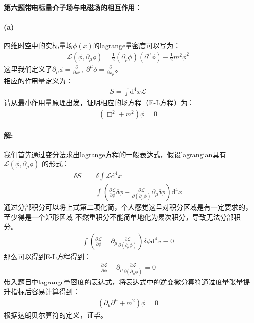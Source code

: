 \documentclass[a4paper]{ctexart}
\def\d{\mathrm{d}}
\begin{document}
    \paragraph{第六题\;带电标量介子场与电磁场的相互作用：}
    \paragraph{(a)}
     四维时空中的实标量场$\phi(x)$的lagrange量密度可以写为：
    \begin{align}
        \mathcal{L}(\phi, \partial_{\mu}\phi) = \frac{1}{2}(\partial_{\mu}\phi)(\partial^{\mu}\phi) - \frac{1}{2}m^{2}\phi^{2}
    \end{align}
    这里我们定义了$\partial_{\mu}\phi = \frac{\partial}{\partial x^{\mu}},\;\partial^{\mu}\phi = \frac{\partial}{\partial x_{\mu}}$。\\
    相应的作用量定义为：
    \begin{align}
        S = \int\d ^{4}x\mathcal{L}
    \end{align}
    请从最小作用量原理出发，证明相应的场方程（E-L方程）为：
    \begin{align}
        (\Box^{2} + m^{2})\phi = 0
    \end{align}
    \paragraph{解:}
    我们首先通过变分法求出lagrange方程的一般表达式，假设lagrangian具有$\mathcal{L}(\phi, \partial_{\mu}\phi)$
    的形式：
    \begin{align}
        \delta S &= \delta\int\mathcal{L}\d^{4} x\\
        & = \int\left(\frac{\partial \mathcal{L}}{\partial \phi}\delta \phi + \frac{\partial\mathcal{L}}{\partial(\partial_{\mu}\phi)}\partial_{\mu}\delta\phi\right)\d^{4}x
    \end{align}
    通过分部积分可以将上式第二项化简，个人感觉这里对积分区域是有一定要求的，至少得是一个矩形区域
    不然重积分不能简单地化为累次积分，导致无法分部积分。
    \begin{align}
        \int\left(\frac{\partial \mathcal{L}}{\partial \phi} - \partial_{\mu}\frac{\partial\mathcal{L}}{\partial(\partial_{\mu}\phi)}\right)\delta\phi \d^{4}x = 0
    \end{align}
    那么可以得到E-L方程得到：
    \begin{align}
        \frac{\partial \mathcal{L}}{\partial \phi} - \partial_{\mu}\frac{\partial\mathcal{L}}{\partial(\partial_{\mu}\phi)} = 0
    \end{align}
    带入题目中lagrange量密度的表达式，将表达式中的逆变微分算符通过度量张量提升指标后容易计算得到：
    \begin{align}
        (\partial_{\mu}\partial^{\mu} + m^{2})\phi = 0
    \end{align}
    根据达朗贝尔算符的定义，证毕。
\end{document}
